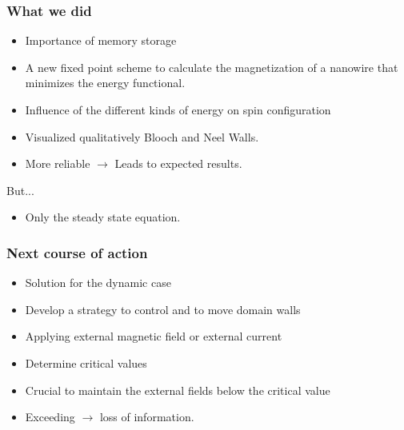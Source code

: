\begin{frame}
	\frametitle{What we did}
	\begin{itemize}
		\item Importance of memory storage
		\item A new fixed point scheme to calculate the magnetization of a nanowire that minimizes the energy functional.
		\item Influence of the different kinds of energy on spin configuration		
		\item Visualized qualitatively Blooch and Neel Walls.		
		\item More reliable $\rightarrow$ Leads to expected results.
	\end{itemize}
	But...\\
	\begin{itemize}
		\item 	Only the steady state equation.
	\end{itemize}
	
\end{frame}

\begin{frame}
\frametitle{Next course of action}
\begin{itemize}
	\item Solution for the dynamic case
	\item Develop a strategy to control and to move domain walls
	\item Applying external magnetic field or external current
	\item Determine critical values
	\item Crucial to maintain the external fields below the critical value
	\item Exceeding $\rightarrow$ loss of information.
\end{itemize}
\end{frame}